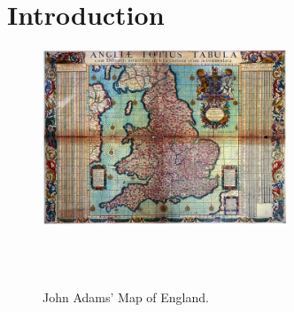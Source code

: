 \chapter{Introduction}
\label{chap:intro}




\newpage
{\footnotesize \hypersetup{linkcolor=black}
\minitoc}

\begin{figure}[p]
{\includegraphics[width=0.65\textwidth]{images/adams1932john}
\caption{John Adams' Map of England. \cite{adams1932john} } \label{fig:historya}
}
~
\\
~

\end{figure}
